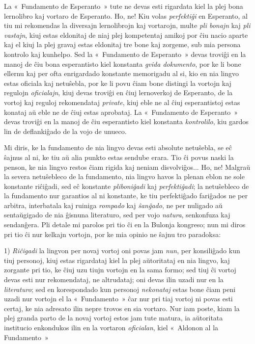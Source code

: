 La «~Fundamento de Esperanto~» tute ne devas esti rigardata kiel la plej bona lernolibro kaj vortaro de Esperanto. Ho, ne! Kiu volas \emph{perfektiĝi} en Esperanto, al tiu mi rekomendas la diversajn lernolibrojn kaj vortarojn, multe \emph{pli bonajn} kaj \emph{pli vastajn}, kiuj estas eldonitaj de niaj plej kompetentaj amikoj por ĉiu nacio aparte kaj el kiuj la plej gravaj estas eldonitaj tre bone kaj zorgeme, sub mia persona kontrolo kaj kunhelpo. Sed la «~Fundamento de Esperanto~» devas troviĝi en la manoj de ĉiu bona esperantisto kiel konstanta \emph{gvida dokumento}, por ke li bone ellernu kaj per ofta enrigardado konstante memorigadu al si, kio en nia lingvo estas oficiala kaj netuŝebla, por ke li povu ĉiam bone distingi la vortojn kaj regulojn \emph{oficialajn}, kiuj devas troviĝi en ĉiuj lernoverkoj de Esperanto, de la vortoj kaj reguloj rekomendataj \emph{private}, kiuj eble ne al ĉiuj esperantistoj estas konataj aŭ eble ne de ĉiuj estas aprobataj. La «~Fundamento de Esperanto~» devas troviĝi en la manoj de ĉiu esperantisto kiel konstanta \emph{kontrolilo}, kiu gardos lin de deflankiĝado de la vojo de unueco.

Mi diris, ke la fundamento de nia lingvo devas esti absolute netuŝebla, se eĉ ŝajnus al ni, ke tiu aŭ alia punkto estas sendube erara. Tio ĉi povus naski la penson, ke nia lingvo restos ĉiam rigida kaj neniam disvolviĝos... Ho, ne! Malgraŭ la severa netuŝebleco de la fundamento, nia lingvo havos la plenan eblon ne sole konstante riĉiĝadi, sed eĉ konstante \emph{pliboniĝadi} kaj \emph{perfektiĝadi}; la netuŝebleco de la fundamento nur garantios al ni konstante, ke tiu perfektiĝado fariĝados ne per arbitra, interbatala kaj ruiniga \emph{rompado} kaj \emph{ŝanĝado}, ne per nuligado aŭ sentaŭgigado de nia ĝisnuna literaturo, sed per vojo \emph{natura}, senkonfuza kaj sendanĝera. Pli detale mi parolos pri tio ĉi en la Bulonja kongreso; nun mi diros pri tio ĉi nur kelkajn vortojn, por ke mia opinio ne ŝajnu tro paradoksa:

1) \emph{Riĉigadi} la lingvon per novaj vortoj oni povas jam \emph{nun}, per konsiliĝado kun tiuj personoj, kiuj estas rigardataj kiel la plej aŭtoritataj en nia lingvo, kaj zorgante pri tio, ke ĉiuj uzu tiujn vortojn en la sama formo; sed tiuj ĉi vortoj devas esti nur rekomendataj, ne altrudataj; oni devas ilin uzadi nur en la \emph{literaturo}; sed en korespondado kun personoj \emph{nekonataj} estas bone ĉiam peni uzadi nur vortojn el la «~Fundamento~» ĉar nur pri tiaj vortoj ni povas esti certaj, ke nia adresato ilin nepre trovos en sia vortaro. Nur iam poste, kiam la plej granda parto de la novaj vortoj estos jam tute matura, ia aŭtoritata institucio enkondukos ilin en la vortaron \emph{oficialan}, kiel «~Aldonon al la Fundamento~»

